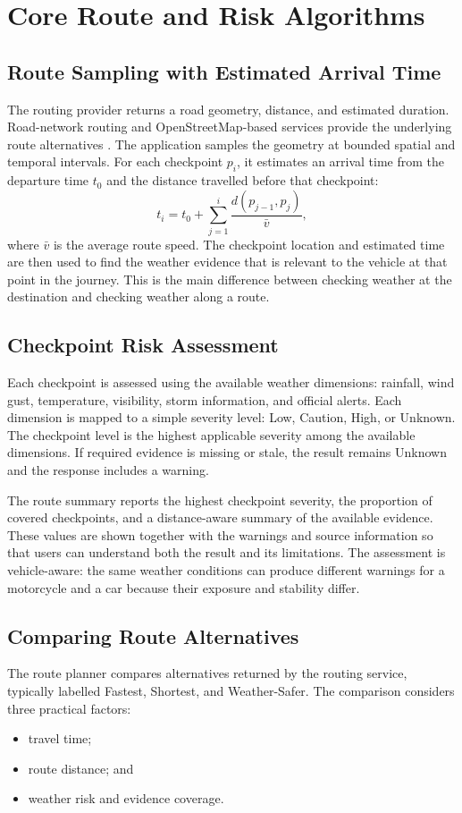 \section{Core Route and Risk Algorithms}
\subsection{Route Sampling with Estimated Arrival Time}
The routing provider returns a road geometry, distance, and estimated duration. Road-network routing and OpenStreetMap-based services provide the underlying route alternatives \cite{haklay2008openstreetmap,luxen2011real,bast2016route}. The application samples the geometry at bounded spatial and temporal intervals. For each checkpoint $p_i$, it estimates an arrival time from the departure time $t_0$ and the distance travelled before that checkpoint:
\begin{equation}
    t_i = t_0 + \sum_{j=1}^{i} \frac{d(p_{j-1},p_j)}{\bar{v}},
\end{equation}
where $\bar{v}$ is the average route speed. The checkpoint location and estimated time are then used to find the weather evidence that is relevant to the vehicle at that point in the journey. This is the main difference between checking weather at the destination and checking weather along a route.

\subsection{Checkpoint Risk Assessment}
Each checkpoint is assessed using the available weather dimensions: rainfall, wind gust, temperature, visibility, storm information, and official alerts. Each dimension is mapped to a simple severity level: Low, Caution, High, or Unknown. The checkpoint level is the highest applicable severity among the available dimensions. If required evidence is missing or stale, the result remains Unknown and the response includes a warning.

The route summary reports the highest checkpoint severity, the proportion of covered checkpoints, and a distance-aware summary of the available evidence. These values are shown together with the warnings and source information so that users can understand both the result and its limitations. The assessment is vehicle-aware: the same weather conditions can produce different warnings for a motorcycle and a car because their exposure and stability differ.

\subsection{Comparing Route Alternatives}
The route planner compares alternatives returned by the routing service, typically labelled Fastest, Shortest, and Weather-Safer. The comparison considers three practical factors:
\begin{itemize}[itemsep=0.25em]
    \item travel time;
    \item route distance; and
    \item weather risk and evidence coverage.
\end{itemize}

